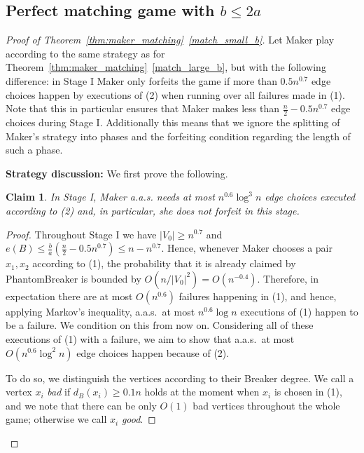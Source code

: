 \documentclass[11pt, a4paper]{article}
\numberwithin{equation}{section}
\numberwithin{figure}{section}
\newtheorem{claim}[theorem]{Claim}
\begin{document}
\bigskip


\subsection{Perfect matching game with $b\leq 2a$}

\begin{proof}[Proof of Theorem~\ref{thm:maker_matching}~\ref{match_small_b}]
Let Maker play according to the same strategy
as for Theorem~\ref{thm:maker_matching}~\ref{match_large_b}, but with the following difference:
in Stage I Maker only forfeits the game if
more than $0.5n^{0.7}$ edge choices happen by executions of (2) when running 
over all failures made in (1).
Note that this in particular ensures that Maker
makes less than $\frac{n}{2} - 0.5n^{0.7}$
edge choices during Stage I.
Additionally this means that we ignore the splitting
of Maker's strategy into phases and the forfeiting condition regarding the length of such a phase.

\smallskip

\textbf{Strategy discussion:} We first prove the following.

\begin{claim}
	In Stage I, 
	Maker a.a.s. needs at most $n^{0.6}\log^3 n$
	edge choices executed according to (2)
	and, in particular, she does not forfeit
	in this stage.
\end{claim}

\begin{proof}
Throughout Stage I we have $|V_0|\geq n^{0.7}$
and $e(B)\leq \frac{b}{a}\left(\frac{n}{2} - 0.5n^{0.7}\right) \leq n - n^{0.7}$.
Hence, whenever Maker chooses a pair $x_1,x_2$ according to (1), the probability
that it is already claimed by PhantomBreaker is bounded
by $O(n/|V_0|^2)=O(n^{-0.4})$. 
Therefore, in expectation there are at most $O(n^{0.6})$
failures happening in (1), and
hence, applying Markov's inequality,
a.a.s.~at most $n^{0.6}\log n$ executions of (1) happen to be a failure.
We condition on this from now on.
Considering all of these executions of (1) with a failure, we aim to show that a.a.s.~at most $O(n^{0.6}\log^2 n)$ edge choices happen because of (2).

To do so, we distinguish the vertices according to their Breaker degree. We call a vertex $x_i$ 
\textit{bad} if $d_B(x_i)\geq 0.1n$ holds
at the moment when $x_i$ is chosen in (1), 
and we note that there can be only
$O(1)$ bad vertices throughout the whole game;
otherwise we call $x_i$ \textit{good}.


\end{proof}
\end{proof}
\end{document}
